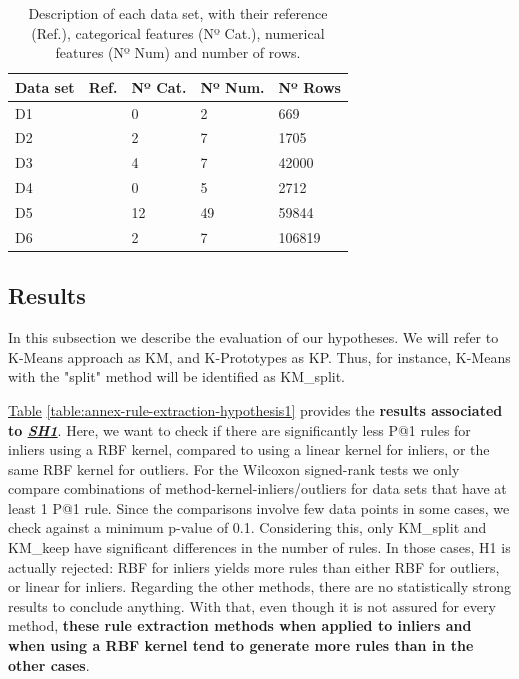 \begin{table}[h!]
\centering
\begin{tabular}{lllll} 
 \textbf{Data set} & \textbf{Ref.} & \textbf{Nº Cat.} & \textbf{Nº Num.} & \textbf{Nº Rows} \\ [0.5ex]
 \hline
 D1 & \parencite{sathe2016lodes} & 0 & 2 & 669\\ 
 D2 & \parencite{sathe2016lodes} & 2 & 7 & 1705\\
 D3 & \parencite{padmanabhan2019physician} & 4 & 7 & 42000\\
 D4 & \parencite{patent2019comms} & 0 & 5 & 2712\\
 D5 & \parencite{patent2020fleet} & 12 & 49 & 59844\\
 D6 & \parencite{blake1998uci} & 2 & 7 & 106819\\  [1ex]
\end{tabular}
\caption{Description of each data set, with their reference (Ref.), categorical features (Nº Cat.), numerical features (Nº Num) and number of rows.}
\label{table:ch4-rule-extraction-datasets}
\end{table}

\subsection{Results}\label{subsec:RuleExtractionResults}
In this subsection we describe the evaluation of our hypotheses. We will refer to K-Means approach as KM, and K-Prototypes as KP. Thus, for instance, K-Means with the "split" method will be identified as KM\_split.

\hyperref[table:annex-rule-extraction-hypothesis1]{Table} \ref{table:annex-rule-extraction-hypothesis1} provides the \textbf{results associated to \textit{\hyperref[subhypothesis:subhypothesis4_1]{SH1}}}. Here, we want to check if there are significantly less P@1 rules for inliers using a RBF kernel, compared to using a linear kernel for inliers, or the same RBF kernel for outliers. For the Wilcoxon signed-rank tests we only compare combinations of method-kernel-inliers/outliers for data sets that have at least 1 P@1 rule. Since the comparisons involve few data points in some cases, we check against a minimum p-value of 0.1. Considering this, only KM\_split and KM\_keep have significant differences in the number of rules. In those cases, H1 is actually rejected: RBF for inliers yields more rules than either RBF for outliers, or linear for inliers. Regarding the other methods, there are no statistically strong results to conclude anything. With that, even though it is not assured for every method, \textbf{these rule extraction methods when applied to inliers and when using a RBF kernel tend to generate more rules than in the other cases}.

